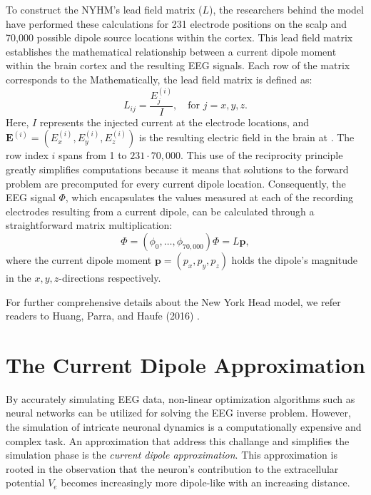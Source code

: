 \documentclass[a4paper, UKenglish, 11pt]{uiomaster}
\begin{document}

To construct the NYHM's lead field matrix (\(L\)), the researchers behind the model have performed these calculations for 231 electrode positions on the scalp and 70,000 possible dipole source locations within the cortex. This lead field matrix establishes the mathematical relationship between a current dipole moment within the brain cortex and the resulting EEG signals.
Each row of the matrix corresponds to the
Mathematically, the lead field matrix is defined as:
\begin{equation}
  L_{ij} = \frac{E_j^{(i)}}{I}, \quad \text{for } j = x, y, z.
  \label{eq:LeadFieldMatrix}
\end{equation}
Here, $I$ represents the injected current at the electrode locations, and $\mathbf{E}^{(i)} = (E_x^{(i)}, E_y^{(i)}, E_z^{(i)})$ is the resulting electric field in the brain at . The row index $i$ spans from 1 to $231 \cdot 70,000$. This use of the reciprocity principle greatly simplifies computations because it means that solutions to the forward problem are precomputed for every current dipole location. Consequently, the EEG signal $\Phi$, which encapsulates the values measured at each of the recording electrodes resulting from a current dipole, can be calculated through a straightforward matrix multiplication:
\begin{equation}
  \Phi = (\phi_0, \dots, \phi_{70,000})
  \Phi = L \mathbf{p},
  \label{eq:EEG_signal_matrix}
\end{equation}
where the current dipole moment $\mathbf{p} = (p_x, p_y, p_z)$ holds the dipole's magnitude in the \(x, y, z\)-directions respectively.

For further comprehensive details about the New York Head model, we refer readers to Huang, Parra, and Haufe (2016) \cite{huang2016new}.


\section{The Current Dipole Approximation}

By accurately simulating EEG data, non-linear optimization algorithms such as neural networks can be utilized for solving the EEG inverse problem. However, the simulation of intricate neuronal dynamics is a computationally expensive and complex task.  An approximation that address this challange and simplifies the simulation phase is the \emph{current dipole approximation}. This approximation is rooted in the observation that the neuron's contribution to the extracellular potential $V_e$ becomes increasingly more dipole-like with an increasing distance.
\end{document}
